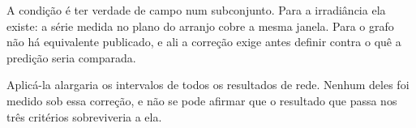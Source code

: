 A condição é ter verdade de campo num subconjunto. Para a irradiância ela
existe: a série medida no plano do arranjo cobre a mesma janela. Para o grafo
não há equivalente publicado, e ali a correção exige antes definir contra o quê
a predição seria comparada.

\begin{objecao}
Aplicá-la alargaria os intervalos de todos os resultados de rede. Nenhum deles
foi medido sob essa correção, e não se pode afirmar que o resultado que passa
nos três critérios sobreviveria a ela.
\end{objecao}

